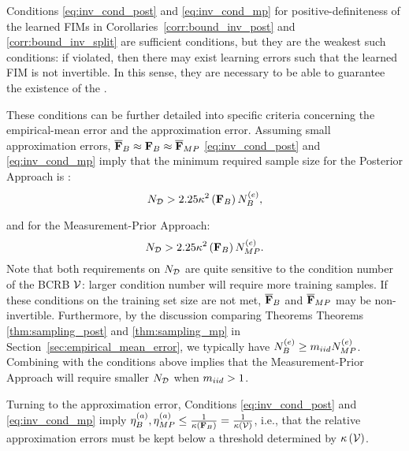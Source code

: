 {{Conditions \eqref{eq:inv_cond_post} and \eqref{eq:inv_cond_mp} for positive-definiteness of the 
learned FIMs in Corollaries~\ref{corr:bound_inv_post} and \ref{corr:bound_inv_split} are sufficient conditions, but they are the weakest such conditions: if violated, then there may exist learning errors such that the learned FIM is not invertible. In this sense, they are necessary to be able to guarantee the existence of the \name{}.}

%
{These conditions %
can be further detailed into %
specific criteria concerning the empirical-mean error and the 
%
approximation error}.
{Assuming small approximation errors, $\overline{\mathbf{F}}_{B} \approx \mathbf{F}_{B} \approx \overline{\mathbf{F}}_{MP}$}
\eqref{eq:inv_cond_post} and \eqref{eq:inv_cond_mp} imply that the minimum required sample size for the Posterior Approach is :
{
\begin{equation*}
    {N_{\mathcal{D}}}>  2.25\kappa^2\left(\mathbf{F}_{B}\right)
    N_B^{(e)},
\end{equation*}
}
}
and for the Measurement-Prior Approach:
\begin{equation*}
    N_{\mathcal{D}}>   2.25\kappa^2\left(\mathbf{F}_{B}\right)N_{MP}^{(e)}.
\end{equation*}
{
}
Note that both requirements on $N_{\mathcal{D}}$ are quite sensitive to the condition number of the BCRB $\mathcal{V}$: larger condition number will require more training samples.
If these conditions on the training set size are not met, $\overline{\mathbf{F}}_{B}$ and $\overline{\mathbf{F}}_{MP}$ 
{may} 
be non-invertible. 
{Furthermore, by the discussion comparing Theorems Theorems \ref{thm:sampling_post} and \ref{thm:sampling_mp} in Section~\ref{sec:empirical_mean_error}, we  typically have $N_B^{(e)} \geq m_{iid} N_{MP}^{(e)}$. Combining with the conditions above implies that the {Measurement-Prior} Approach will require smaller $N_{\mathcal{D}}$ when $m_{iid}>1$.}

{Turning to the approximation error, Conditions \eqref{eq:inv_cond_post} and \eqref{eq:inv_cond_mp} imply
$\eta_{B}^{(a)}, \eta_{MP}^{(a)}\leq \frac{1}{\kappa\left(\mathbf{F}_{B}\right)} = \frac{1}{\kappa\left(\mathcal{V}\right)}$,
i.e., that the relative approximation errors must be kept below a threshold determined by $\kappa\left(\mathcal{V}\right)$. 
}


